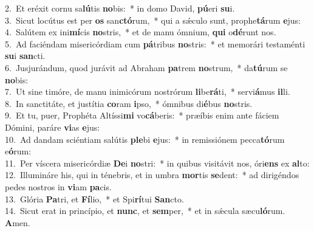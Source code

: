 {2.~}Et eréxit cornu sa\textbf{lú}tis \textbf{no}bis:~* in domo David, \textbf{pú}eri \textbf{su}i.\\
{3.~}Sicut locútus est per \textbf{os} san\textbf{ctó}rum,~* qui a sǽculo sunt, prophe\textbf{tá}rum \textbf{e}jus:\\
{4.~}Salútem ex ini\textbf{mí}cis \textbf{no}stris,~* et de manu ómnium, \textbf{qui} o\textbf{dé}runt nos.\\
{5.~}Ad faciéndam misericórdiam cum \textbf{pá}tribus \textbf{no}stris:~* et memorári testaménti \textbf{su}i \textbf{san}cti.\\
{6.~}Jusjurándum, quod jurávit ad Abraham \textbf{pa}trem \textbf{no}strum,~* da\textbf{tú}rum se \textbf{no}bis:\\
{7.~}Ut sine timóre, de manu inimicórum nostrórum \textbf{li}be\textbf{rá}ti,~* servi\textbf{á}mus \textbf{il}li.\\
{8.~}In sanctitáte, et justítia \textbf{co}ram \textbf{i}pso,~* ómnibus di\textbf{é}bus \textbf{no}stris.\\
{9.~}Et tu, puer, Prophéta Altíssi\textbf{mi} vo\textbf{cá}beris:~* præíbis enim ante fáciem Dómini, paráre \textbf{vi}as \textbf{e}jus:\\
{10.~}Ad dandam sciéntiam salútis \textbf{ple}bi \textbf{e}jus:~* in remissiónem pecca\textbf{tó}rum e\textbf{ó}rum:\\
{11.~}Per víscera misericórdiæ \textbf{De}i \textbf{no}stri:~* in quibus visitávit nos, óri\textbf{ens} ex \textbf{al}to:\\
{12.~}Illumináre his, qui in ténebris, et in umbra \textbf{mor}tis \textbf{se}dent:~* ad dirigéndos pedes nostros in \textbf{vi}am \textbf{pa}cis.\\
{13.~}Glória \textbf{Pa}tri, et \textbf{Fí}lio,~* et Spi\textbf{rí}tui \textbf{San}cto.\\
{14.~}Sicut erat in princípio, et \textbf{nunc}, et \textbf{sem}per,~* et in sǽcula sæcu\textbf{ló}rum. \textbf{A}men.\\
